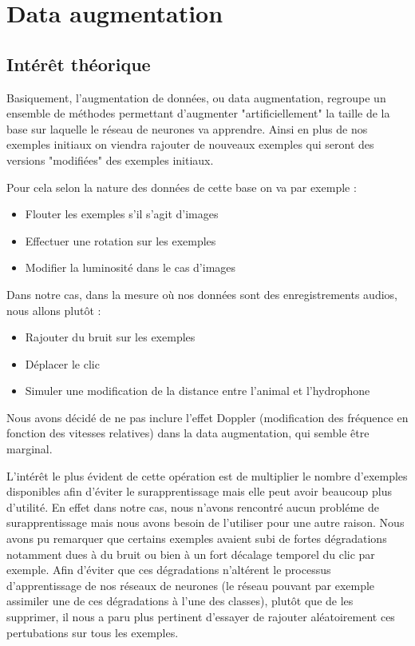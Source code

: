 \hypertarget{Data-augmentation}{%
\section{Data augmentation}
\label{Data-augmentation}}

\hypertarget{}{%
\subsection{Intérêt théorique}
\label{interets_theoriques}}

Basiquement, l'augmentation de données, ou data augmentation, regroupe un ensemble de méthodes permettant d'augmenter "artificiellement" la taille de la base sur laquelle le réseau de neurones va apprendre. Ainsi en plus de nos exemples initiaux on viendra rajouter de nouveaux exemples qui seront des versions "modifiées" des exemples initiaux.

Pour cela selon la nature des données de cette base on va par exemple :
\begin{itemize}
\item Flouter les exemples s'il s'agit d'images
\item Effectuer une rotation sur les exemples
\item Modifier la luminosité dans le cas d'images
\end{itemize}

Dans notre cas, dans la mesure où nos données sont des enregistrements audios, nous allons plutôt :
\begin{itemize}
\item Rajouter du bruit sur les exemples
\item Déplacer le clic
\item Simuler une modification de la distance entre l'animal et l'hydrophone
\end{itemize}

Nous avons décidé de ne pas inclure l'effet Doppler (modification des fréquence en fonction des vitesses relatives) dans la data augmentation, qui semble être 
marginal.

L'intérêt le plus évident de cette opération est de multiplier le nombre d'exemples disponibles afin d'éviter le surapprentissage mais elle peut avoir beaucoup plus d'utilité. 
En effet dans notre cas, nous n'avons rencontré aucun probléme de surapprentissage mais nous avons besoin de l'utiliser pour une autre raison.
Nous avons pu remarquer que certains exemples avaient subi de fortes dégradations notamment dues 
à du bruit ou bien à un fort décalage temporel du clic par exemple. 
Afin d'éviter que ces dégradations n'altérent le processus d'apprentissage de nos réseaux de neurones (le réseau pouvant par exemple assimiler une de ces dégradations à l'une des classes), 
plutôt que de les supprimer, il nous a paru plus pertinent d'essayer de rajouter aléatoirement ces
pertubations sur tous les exemples.
 

